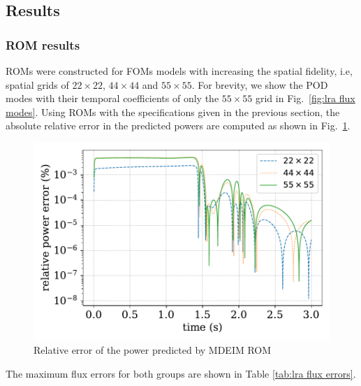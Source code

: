 \documentclass[]{interact}
\theoremstyle{plain}%
\theoremstyle{definition}
\theoremstyle{remark}
\begin{document}
\subsection{Results}

\subsubsection{ROM results}
ROMs were constructed for FOMs models with increasing the spatial fidelity, i.e, spatial grids of $22\times 22$, $44\times44$ and $55 \times 55$.
For brevity, we show the POD modes with their temporal coefficients of only the $55 \times 55$  grid in Fig.~\ref{fig:lra flux modes}.
Using ROMs with the specifications given in the previous section, the absolute relative error in the predicted powers are computed as shown in Fig.~\ref{fig:deim power error}.
\begin{figure}[H]
	\includegraphics[width=1.0\linewidth]{../figures/LRA_power_deim_relative_error.pdf}
	\caption{Relative error of the power predicted by MDEIM ROM}
	\label{fig:deim power error}
\end{figure}
The maximum flux errors for both groups are shown in Table \ref{tab:lra flux errors}.
\end{document}
